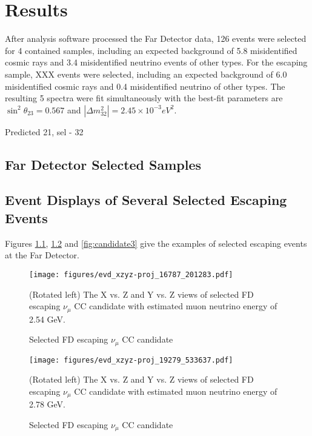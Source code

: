 \chapter{Results}
\label{results_chapter}

After analysis software processed the Far Detector data, 126 events were selected for 4 contained 
samples, including an expected background of 5.8 misidentified cosmic rays and 3.4 misidentified 
neutrino events of other types. For the escaping sample, XXX events were selected, including an expected
background of 6.0 misidentified cosmic rays and 0.4 misidentified neutrino of other types. The resulting
5 spectra were fit simultaneously with the best-fit parameters are $\sin^2\theta_{23} = 0.567$ and 
$|\Delta m^2_{32}| = 2.45\times 10^{-3} eV^2$.

Predicted 21, sel - 32

\section{Far Detector Selected Samples}

\section{Event Displays of Several Selected Escaping Events}
Figures \ref{fig:candidate1}, \ref{fig:candidate2} and \ref{fig:candidate3} give the examples of selected escaping 
events at the Far Detector.
\clearpage
\begin{figure}[!th]
\centering
\texttt{[image: figures/evd\_xzyz-proj\_16787\_201283.pdf]}
\caption{Selected FD escaping $\nu_\mu$ CC candidate}
{(Rotated left) The X vs. Z and Y vs. Z views of selected FD escaping $\nu_\mu$ CC candidate with estimated muon 
neutrino energy of 2.54 GeV.}
\label{fig:candidate1}
\end{figure}

\clearpage
\begin{figure}[!th]
\centering
\texttt{[image: figures/evd\_xzyz-proj\_19279\_533637.pdf]}
\caption{Selected FD escaping $\nu_\mu$ CC candidate}
{(Rotated left) The X vs. Z and Y vs. Z views of selected FD escaping $\nu_\mu$ CC candidate with estimated muon
neutrino energy of 2.78 GeV.}
\label{fig:candidate2}
\end{figure}

